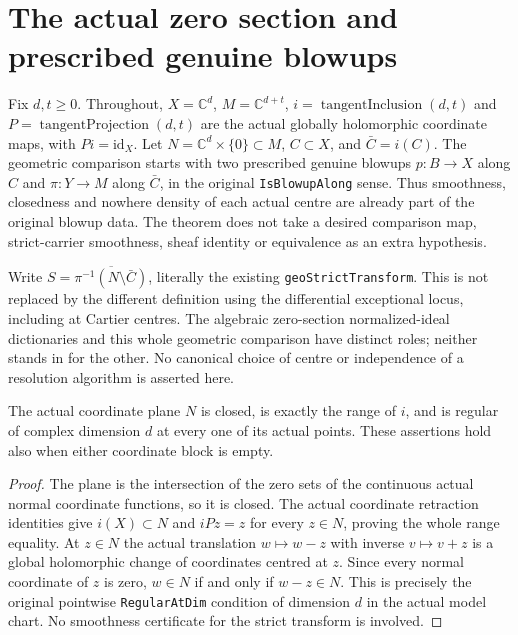 \section{The actual zero section and prescribed genuine blowups}

Fix $d,t\geq0$. Throughout, $X=\mathbb C^d$, $M=\mathbb C^{d+t}$,
$i=\operatorname{tangentInclusion}(d,t)$ and
$P=\operatorname{tangentProjection}(d,t)$ are the actual globally
holomorphic coordinate maps, with $Pi=\mathrm{id}_X$. Let
$N=\mathbb C^d\times\{0\}\subset M$, $C\subset X$, and $\bar C=i(C)$.
The geometric comparison starts with two prescribed genuine blowups
$p:B\to X$ along $C$ and $\pi:Y\to M$ along $\bar C$, in the original
\texttt{IsBlowupAlong} sense. Thus smoothness, closedness and nowhere
density of each actual centre are already part of the original blowup
data. The theorem does not take a desired comparison map, strict-carrier
smoothness, sheaf identity or equivalence as an extra hypothesis.

Write $S=\overline{\pi^{-1}(N\setminus\bar C)}$, literally the existing
\texttt{geoStrictTransform}. This is not replaced by the different
definition using the differential exceptional locus, including at Cartier
centres. The algebraic zero-section normalized-ideal dictionaries and this
whole geometric comparison have distinct roles; neither stands in for the
other. No canonical choice of centre or independence of a resolution
algorithm is asserted here.

\begin{lemma}
\label{hir:actual-zero-section-whole-carrier-regular}
\leanok
The actual coordinate plane $N$ is closed, is exactly the range of $i$,
and is regular of complex dimension $d$ at every one of its actual points.
These assertions hold also when either coordinate block is empty.
\end{lemma}
\begin{proof}
The plane is the intersection of the zero sets of the continuous actual
normal coordinate functions, so it is closed. The actual coordinate
retraction identities give $i(X)\subset N$ and $iPz=z$ for every
$z\in N$, proving the whole range equality. At $z\in N$ the actual
translation $w\mapsto w-z$ with inverse $v\mapsto v+z$ is a global
holomorphic change of coordinates centred at $z$. Since every normal
coordinate of $z$ is zero, $w\in N$ if and only if $w-z\in N$.
This is precisely the original pointwise \texttt{RegularAtDim} condition
of dimension $d$ in the actual model chart. No smoothness certificate for
the strict transform is involved.
\end{proof}

